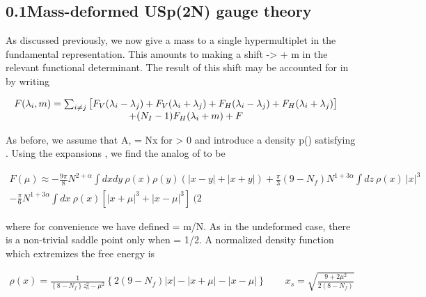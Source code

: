 \documentclass{article}
\begin{document}
\sloppy

\subsection*{0.1Mass-deformed USp(2N) gauge theory}


As discussed previously, we now give a mass to a single hypermultiplet in the fundamental
representation. This amounts to making a shift  ->  + m in the relevant functional
determinant. The result of this shift may be accounted for in by writing


\begin{equation}
\begin{array} { c c } { F ( \lambda _ { i }, m ) = \sum _ { i \neq j } \big [ F _ { V } ( \lambda _ { i } - \lambda _ { j } ) + F _ { V } ( \lambda _ { i } + \lambda _ { j } ) + F _ { H } ( \lambda _ { i } - \lambda _ { j } ) + F _ { H } ( \lambda _ { i } + \lambda _ { j } ) \big ] } & { } \\ { \qquad + ( N _ { I } - 1 ) F _ { H } ( \lambda _ { i } + m ) + F _ {}}\end{array}
\end{equation}


As before, we assume that A, = Nx for  > 0 and introduce a density p() satisfying .
Using the expansions , we find the analog of to be


\begin{equation}
\begin{array} { r } { F ( \mu ) \approx - \frac { 9 \pi } { 8 } N ^ { 2 + \alpha } \int d x d y ~ \rho ( x ) \rho ( y ) \left ( | x - y | + | x + y | \right ) + \frac { \pi } { 3 } ( 9 - N _ { f } ) N ^ { 1 + 3 \alpha } \int d z ~ \rho ( x ) ~ | x | ^ { 3 } } \\ { - \frac { \pi } { 6 } N ^ { 1 + 3 \alpha } \int d x ~ \rho ( x ) \left [ | x + \mu | ^ { 3 } + | x - \mu | ^ { 3 } \right ] ~ ( 2}\end{array}
\end{equation}


where for convenience we have defined  = m/N. As in the undeformed case, there is a
non-trivial saddle point only when  = 1/2. A normalized density function which extremizes
the free energy is


\begin{equation}
\begin{array} { r } { \rho ( x ) = \frac { 1 } { \left \{ 8 - N _ { f } \right \} z _ { a } ^ { 2 } - \mu ^ { 2 } } \left \{ 2 ( 9 - N _ { f } ) | x | - | x + \mu | - | x - \mu | \right \} \qquad x _ { s } = \sqrt { \frac { 9 + 2 \mu ^ { 2 } } { 2 ( 8 - N _ { f } ) } } \qquad }\end{array}
\end{equation}
\end{document}

